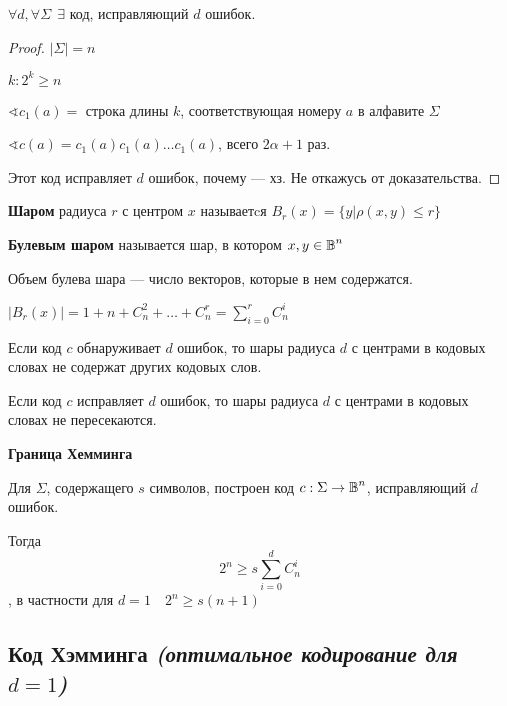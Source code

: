 \begin{lemma}
    $\forall d, \forall \Sigma \ \ \exists$ код, исправляющий $d$ ошибок.
\end{lemma}
\begin{proof}
    $|\Sigma| = n$
    
    $k : 2^k\geq n$

    $\sphericalangle c_1(a) = $ строка длины $k$, соответствующая номеру $a$ в алфавите $\Sigma$

    $\sphericalangle c(a) = c_1(a)c_1(a)\ldots c_1(a)$, всего $2\alpha + 1$ раз.

    Этот код исправляет $d$ ошибок, почему --- хз. Не откажусь от доказательства.
\end{proof}

\begin{definition}
    {\bf Шаром} радиуса $r$ с центром $x$ называетcя $B_r(x)=\{y|\rho(x,y)\leq r\}$
\end{definition}

\begin{definition}
    {\bf Булевым шаром} называется шар, в котором $x,y\in \operatorname*{\mathbb{B}}^n$
\end{definition}

\begin{definition}
    Объем булева шара --- число векторов, которые в нем содержатся.
\end{definition}

$|B_r(x)|=1+n+C_n^2+\ldots + C_n^r=\sum\limits_{i=0}^{r}C_n^i$

\begin{lemma}
    Если код $c$ обнаруживает $d$ ошибок, то шары радиуса $d$ с центрами в кодовых словах не содержат других кодовых слов.
\end{lemma}
\begin{lemma}
    Если код $c$ исправляет $d$ ошибок, то шары радиуса $d$ с центрами в кодовых словах не пересекаются.
\end{lemma}

\begin{theorem}
    {\bf Граница Хемминга}

    Для $\Sigma$, содержащего $s$ символов, построен код $c:\Sigma\to\operatorname*{\mathbb{B}}^n$, исправляющий $d$ ошибок.

    Тогда $$2^n\geq s\sum\limits_{i=0}^d C_n^i$$, в частности для $d=1 \quad 2^n\geq s(n+1)$
\end{theorem}

\subsection{Код Хэмминга {\it (оптимальное кодирование для $d=1$)}}

